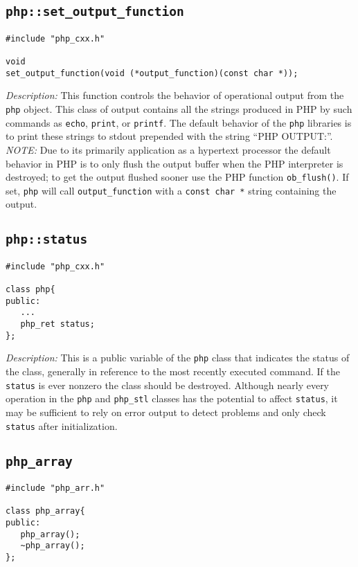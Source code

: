 \documentclass[11pt,titlepage]{article}
\begin{document}
\subsection{\texttt{php::set\_output\_function}}

\begin{verbatim}
#include "php_cxx.h"

void 
set_output_function(void (*output_function)(const char *));
\end{verbatim}

\emph{Description:} This function controls the behavior of operational output from the \verb|php| object. This class of output contains all the strings produced in PHP by such commands as \verb|echo|, \verb|print|, or \verb|printf|. The default behavior of the \verb|php| libraries is to print these strings to stdout prepended with the string ``PHP OUTPUT:''. \emph{NOTE:} Due to its primarily application as a hypertext processor the default behavior in PHP is to only flush the output buffer when the PHP interpreter is destroyed; to get the output flushed sooner use the PHP function \verb|ob_flush()|. If set, \verb|php| will call \verb|output_function| with a \verb|const char *| string containing the output.


\subsection{\texttt{php::status}}

\begin{verbatim}
#include "php_cxx.h"

class php{
public:
   ...
   php_ret status;
};
\end{verbatim}

\emph{Description:} This is a public variable of the \verb|php| class that indicates the status of the class, generally in reference to the most recently executed command. If the \verb|status| is ever nonzero the class should be destroyed. Although nearly every operation in the \verb|php| and \verb|php_stl| classes has the potential to affect \verb|status|, it may be sufficient to rely on error output to detect problems and only check \verb|status| after initialization.


\subsection{\texttt{php\_array}}

\begin{verbatim}
#include "php_arr.h"

class php_array{
public:
   php_array();
   ~php_array();
};
\end{verbatim}
\end{document}
